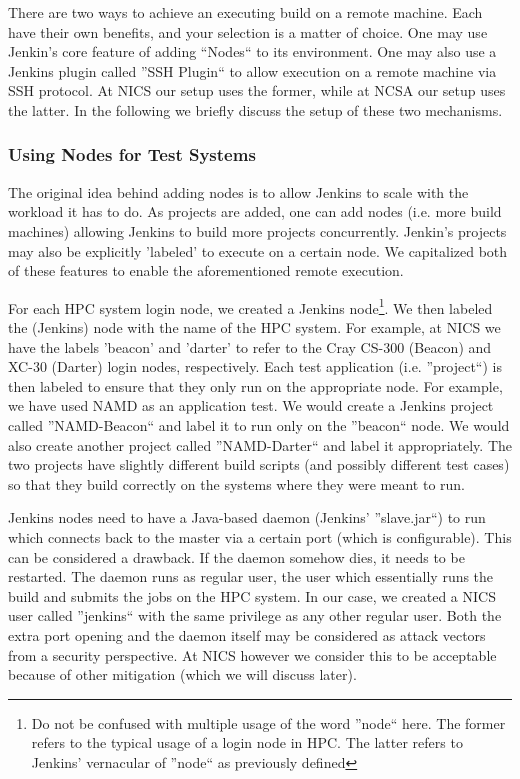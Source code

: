 \documentclass[10pt, conference, compsocconf]{IEEEtran}
\begin{document}
There are two ways to achieve an executing build on a remote machine. 
Each have their own benefits, and your selection is a matter of choice. 
One may use Jenkin's core feature of adding ``Nodes`` to its environment. 
One may also use a Jenkins plugin called ''SSH Plugin`` to allow execution on a remote machine via SSH protocol. 
At NICS our setup uses the former, while at NCSA our setup uses the latter. 
In the following we briefly discuss the setup of these two mechanisms.

\subsubsection{Using Nodes for Test Systems}
The original idea behind adding nodes is to allow Jenkins to scale with the workload it has to do. 
As projects are added, one can add nodes (i.e. more build machines) allowing Jenkins to build more projects concurrently. 
Jenkin's projects may also be explicitly 'labeled' to execute on a certain node. 
We capitalized both of these features to enable the aforementioned remote execution.

For each HPC system login node, we created a Jenkins node\footnote{Do not be confused with multiple usage of the word ''node`` here. 
The former refers to the typical usage of a login node in HPC. 
The latter refers to Jenkins' vernacular of ''node`` as previously defined}. 
We then labeled the (Jenkins) node with the name of the HPC system. 
For example, at NICS we have the labels 'beacon' and 'darter' to refer to the Cray CS-300 (Beacon) and XC-30 (Darter) login nodes, respectively. 
Each test application (i.e. ''project``) is then labeled to ensure that they only run on the appropriate node. 
For example, we have used NAMD \cite{namd} as an application test. 
We would create a Jenkins project called ''NAMD-Beacon`` and label it to run only on the ''beacon`` node. 
We would also create another project called ''NAMD-Darter`` and label it appropriately. 
The two projects have slightly different build scripts (and possibly different test cases) so that they build correctly on the systems where they were meant to run.

Jenkins nodes need to have a Java-based daemon (Jenkins' ''slave.jar``) to run which connects back to the master via a certain port (which is configurable). 
This can be considered a drawback. 
If the daemon somehow dies, it needs to be restarted. 
The daemon runs as regular user, the user which essentially runs the build and submits the jobs on the HPC system. 
In our case, we created a NICS user called ''jenkins`` with the same privilege as any other regular user. 
Both the extra port opening and the daemon itself may be considered as attack vectors from a security perspective. 
At NICS however we consider this to be acceptable because of other mitigation (which we will discuss later).
\end{document}
